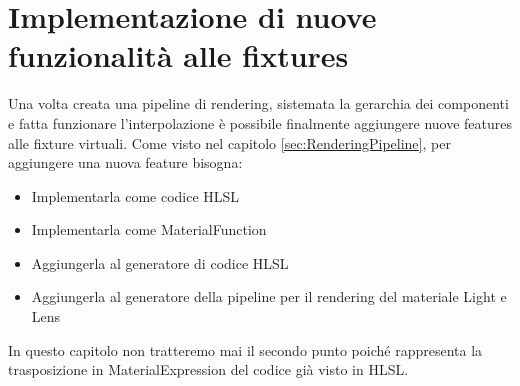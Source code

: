 \documentclass[main.tex]{subfiles}
\begin{document}
\sloppy


\vspace{1.0cm}

\section{Implementazione di nuove funzionalità alle fixtures}\label{sec:NewFeatures}
Una volta creata una pipeline di rendering, sistemata la gerarchia dei componenti e fatta funzionare l'interpolazione è possibile finalmente aggiungere nuove features alle fixture virtuali. Come visto nel capitolo \ref{sec:RenderingPipeline}, per aggiungere una nuova feature bisogna:
\begin{itemize}
	\item Implementarla come codice HLSL
	\item Implementarla come MaterialFunction
	\item Aggiungerla al generatore di codice HLSL
	\item Aggiungerla al generatore della pipeline per il rendering del materiale Light e Lens
\end{itemize}
In questo capitolo non tratteremo mai il secondo punto poiché rappresenta la trasposizione in MaterialExpression del codice già visto in HLSL.
\end{document}
